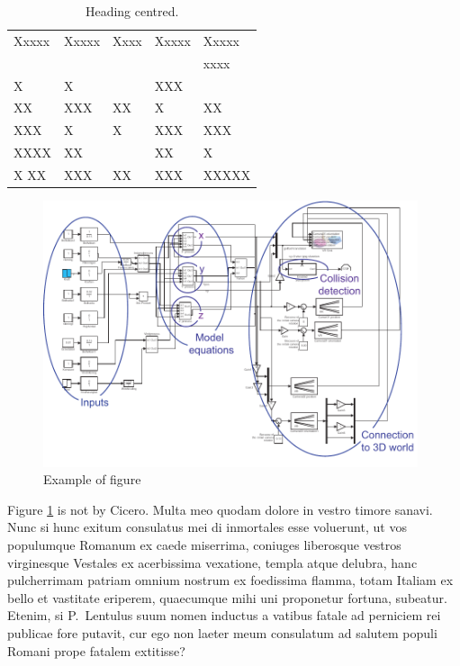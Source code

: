 \documentclass[a4paper,12pt,twoside,swedish]{report}
\begin{document}
\begin{table}[htbp]
  \caption{Heading centred.}
  \label{table_example}
  \begin{tabular*}{\hsize}{lllll}
\hline
Xxxxx & Xxxxx & Xxxx & Xxxxx & Xxxxx \\
      &       &      &       & xxxx  \\
\hline
X     & X     &      & XXX   &       \\
XX    & XXX   & XX   & X     & XX    \\
XXX   & X     & X    & XXX   & XXX   \\
XXXX  & XX    &      & XX    & X     \\
X XX  & XXX   & XX   & XXX   & XXXXX \\
\hline
  \end{tabular*}
\end{table}


\begin{figure}
\begin{center}
    \includegraphics[width=11cm]{Figures/block_simulink.pdf} 
\end{center}
\caption{Example of figure}
\label{model_block}
\end{figure}

Figure \ref{model_block} is not by Cicero.
Multa meo quodam dolore in vestro timore sanavi. Nunc si hunc exitum
consulatus mei di inmortales esse voluerunt, ut vos populumque Romanum
ex caede miserrima, coniuges liberosque vestros virginesque Vestales ex
acerbissima vexatione, templa atque delubra, hanc pulcherrimam patriam
omnium nostrum ex foedissima flamma, totam Italiam ex bello et vastitate
eriperem, quaecumque mihi uni proponetur fortuna, subeatur. Etenim, si
P.~Lentulus suum nomen inductus a vatibus fatale ad perniciem rei
publicae fore putavit, cur ego non laeter meum consulatum ad salutem
populi Romani prope fatalem extitisse?
\end{document}
